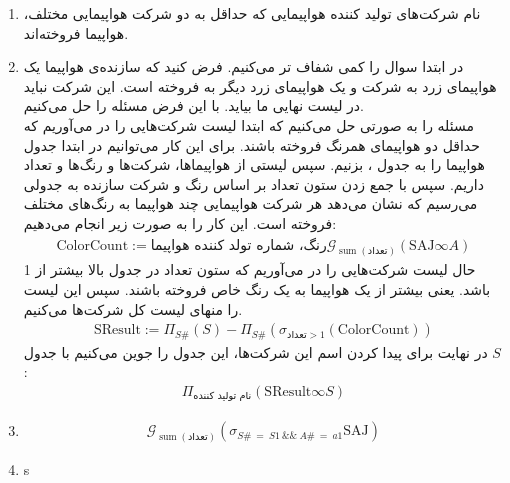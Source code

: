 \begin{enumerate}
    \item نام شرکت‌های تولید کننده هواپیمایی که حداقل به دو شرکت هواپیمایی مختلف، هواپیما فروخته‌اند.
    \item در ابتدا سوال را کمی شفاف تر می‌کنیم. فرض کنید که سازنده‌ی هواپیما
    یک هواپیمای زرد به شرکت
    و یک هواپیمای زرد دیگر به
    فروخته است. این شرکت نباید در لیست نهایی ما بیاید. با این فرض مسئله را حل می‌کنیم.
    \\
    مسئله را به صورتی حل می‌کنیم که ابتدا لیست شرکت‌هایی را در می‌آوریم که حداقل دو هواپیمای همرنگ فروخته باشند.
    برای این کار می‌توانیم در ابتدا جدول هواپیما را به جدول
    ، 
    بزنیم. سپس لیستی از هواپیما‌ها، شرکت‌ها و رنگ‌ها و تعداد داریم. سپس با جمع زدن ستون تعداد بر اساس رنگ و شرکت سازنده
    به جدولی می‌رسیم که نشان می‌دهد هر شرکت هواپیمایی چند هواپیما به رنگ‌های مختلف فروخته است. این کار را به صورت زیر
    انجام می‌دهیم:
    \begin{gather*}
        \text{ColorCount} := \text{رنگ، شماره تولد کننده هواپیما}\mathcal{G}_{\operatorname{sum}(\text{تعداد})}(\text{SAJ} \infty A)
    \end{gather*}
    حال لیست شرکت‌هایی را در می‌آوریم که ستون تعداد در جدول بالا بیشتر از 1 باشد. یعنی بیشتر از یک هواپیما به
    یک رنگ خاص فروخته باشند. سپس این لیست را منهای لیست کل شرکت‌ها می‌کنیم.
    \begin{gather*}
        \text{SResult} := \Pi_{S\#} (S) - \Pi_{S\#}(\sigma_{\text{تعداد} > 1}(\text{ColorCount}))
    \end{gather*}
    در نهایت برای پیدا کردن اسم این شرکت‌ها، این جدول را جوین می‌کنیم با جدول
    $S$:
    \begin{gather*}
        \Pi_{\text{نام تولید کننده}} (\text{SResult} \infty S)
    \end{gather*}
    \item
    \begin{gather*}
        \mathcal{G}_{\operatorname{sum}(\text{تعداد})}(\sigma_{S\# ~ = ~S1 ~ \&\& ~ A\#~=~a1} \text{SAJ})
    \end{gather*}
    \item s
\end{enumerate}